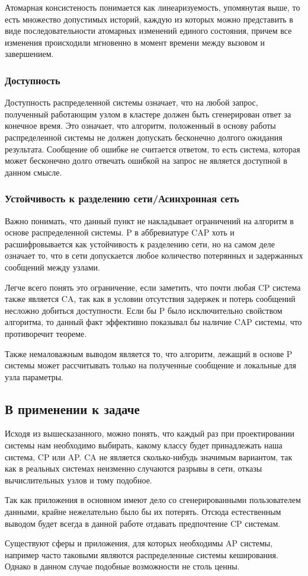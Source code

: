 Атомарная консистеность понимается как линеаризуемость, упомянутая выше, то есть множество допустимых историй, каждую из которых можно представить в виде последовательности атомарных изменений единого состояния, причем все изменения происходили мгновенно в момент времени между вызовом и завершением.

\subsubsection{Доступность}

Доступность распределенной системы означает, что на любой запрос, полученный работающим узлом в кластере должен быть сгенерирован ответ за конечное время. Это означает, что алгоритм, положенный в основу работы распределенной системы не должен допускать бесконечно долгого ожидания результата. Сообщение об ошибке не считается ответом, то есть система, которая может бесконечно долго отвечать ошибкой на запрос не является доступной в данном смысле.

\subsubsection{Устойчивость к разделению сети/Асинхронная сеть}

Важно понимать, что данный пункт не накладывает ограничений на алгоритм в основе распределенной системы. P в аббревиатуре CAP хоть и расшифровывается как устойчивость к разделению сети, но на самом деле означает то, что в сети допускается любое количество потерянных и задержанных сообщений между узлами.

Легче всего понять это ограничение, если заметить, что почти любая CP система также является CA, так как в условии отсутствия задержек и потерь сообщений несложно добиться доступности. Если бы P было исключительно свойством алгоритма, то данный факт эффективно показывал бы наличие CAP системы, что противоречит теореме.

Также немаловажным выводом является то, что алгоритм, лежащий в основе P системы может рассчитывать только на полученные сообщение и локальные для узла параметры.

\subsection{В применении к задаче}

Исходя из вышесказанного, можно понять, что каждый раз при проектировании системы нам необходимо выбирать, какому классу будет принадлежать наша система, CP или AP. CA не является сколько-нибудь значимым вариантом, так как в реальных системах неизменно случаются разрывы в сети, отказы вычислительных узлов и тому подобное.

Так как приложения в основном имеют дело со сгенерированными пользователем данными, крайне нежелательно было бы их потерять. Отсюда естественным выводом будет всегда в данной работе отдавать предпочтение CP системам.

Существуют сферы и приложения, для которых необходимы AP системы, например часто таковыми являются распределенные системы кеширования. Однако в данном случае подобные возможности не столь ценны.

\clearpage
